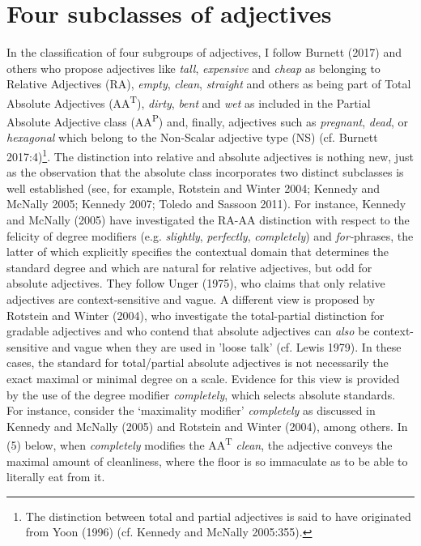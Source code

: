 \documentclass[output=paper
,modfonts
,nonflat]{langsci/langscibook}
\begin{document}
\section{Four subclasses of adjectives}
\label{sec:four-adj}
In the classification of four subgroups of adjectives, I follow Burnett (2017) and others who propose adjectives like \textit{tall}, \textit{expensive} and \textit{cheap} as belonging to Relative Adjectives (RA), \textit{empty}, \textit{clean}, \textit{straight} and others as being part of Total Absolute Adjectives (AA\textsuperscript{T}), \textit{dirty}, \textit{bent} and \textit{wet} as included in the Partial Absolute Adjective class (AA\textsuperscript{P}) and, finally, adjectives such as \textit{pregnant}, \textit{dead}, or \textit{hexagonal} which belong to the Non-Scalar adjective type (NS) (cf. Burnett 2017:4)\footnote{The distinction between total and partial adjectives is said to have originated from Yoon (1996) (cf. Kennedy and McNally 2005:355).}. The distinction into relative and absolute adjectives is nothing new, just as the observation that the absolute class incorporates two distinct subclasses is well established (see, for example, Rotstein and Winter 2004; Kennedy and McNally 2005; Kennedy 2007; Toledo and Sassoon 2011). For instance, Kennedy and McNally (2005) have investigated the RA-AA distinction with respect to the felicity of degree modifiers (e.g. \textit{slightly},  \textit{perfectly},  \textit{completely}) and \textit{for-}phrases, the latter of which explicitly specifies the contextual domain that determines the standard degree and which are natural for relative adjectives, but odd for absolute adjectives. They follow Unger (1975), who claims that only relative adjectives are context-sensitive and vague.
A different view is proposed by Rotstein and Winter (2004), who investigate the total-partial distinction for gradable adjectives and who contend that absolute adjectives can \textit{also} be context-sensitive and vague when they are used in 'loose talk' (cf. Lewis 1979). In these cases, the standard for total/partial absolute adjectives is not necessarily the exact maximal or minimal degree on a scale. Evidence for this view is provided by the use of the degree modifier \textit{completely}, which selects absolute standards. For instance, consider the `maximality modifier' \textit{completely} as discussed in Kennedy and McNally (2005) and Rotstein and Winter (2004), among others. In (5) below, when \textit{completely} modifies the AA\textsuperscript{T} \textit{clean}, the adjective conveys the maximal amount of cleanliness, where the floor is so immaculate as to be able to literally eat from it. 
\end{document}
